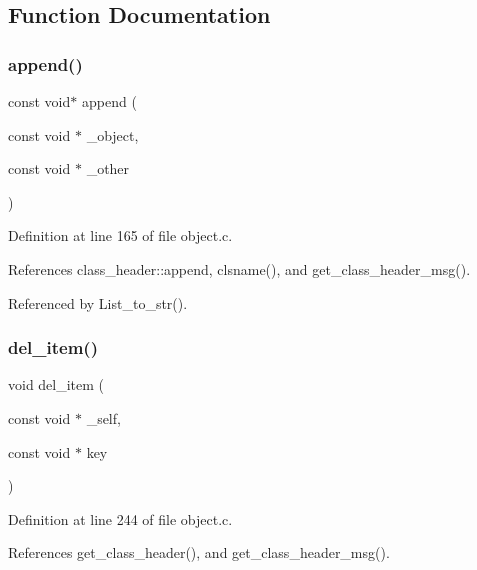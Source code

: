 \subsection{Function Documentation}
\mbox{\label{group__collection_ga2bd4216bcf1d5810032394f57fbf5c2f}} 
\subsubsection{\texorpdfstring{append()}{append()}}
{\footnotesize\ttfamily const void$\ast$ append (\begin{DoxyParamCaption}\item[{const void $\ast$}]{\+\_\+object,  }\item[{const void $\ast$}]{\+\_\+other }\end{DoxyParamCaption})}



Definition at line 165 of file object.\+c.



References class\+\_\+header\+::append, clsname(), and get\+\_\+class\+\_\+header\+\_\+msg().



Referenced by List\+\_\+to\+\_\+str().

\mbox{\label{group__collection_ga8b99290b943601321e5bf291daecaae3}} 
\subsubsection{\texorpdfstring{del\+\_\+item()}{del\_item()}}
{\footnotesize\ttfamily void del\+\_\+item (\begin{DoxyParamCaption}\item[{const void $\ast$}]{\+\_\+self,  }\item[{const void $\ast$}]{key }\end{DoxyParamCaption})}



Definition at line 244 of file object.\+c.



References get\+\_\+class\+\_\+header(), and get\+\_\+class\+\_\+header\+\_\+msg().

\mbox{\label{group__collection_gacfda61f6ab04bc36786ceb00fab70775}} 
